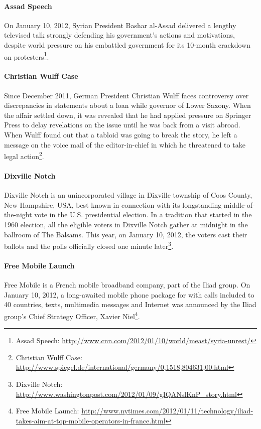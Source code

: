 \documentclass{acm_proc_article-sp}
\newcommand{\inlinelistingsize}{\fontsize{8pt}{11pt}}
\let\oldurl\url
\renewcommand{\url}[1]{\inlinelistingsize\oldurl{#1}}
\begin{document}
\paragraph{Assad Speech}
On January 10, 2012, Syrian President Bashar al-Assad delivered a lengthy televised talk strongly defending his government's actions and motivations, despite world pressure on his embattled government for its 10-month crackdown on protesters\footnote{Assad Speech: \url{http://www.cnn.com/2012/01/10/world/meast/syria-unrest/}}. 

\paragraph{Christian Wulff Case}
Since December 2011, German President Christian Wulff faces controversy over discrepancies in statements about a loan while governor of Lower Saxony.
When the affair settled down, it was revealed that he had applied pressure on Springer Press to delay revelations on the issue until he was back from a visit abroad.
When Wulff found out that a tabloid was going to break the story, he left a message on the voice mail of the editor-in-chief in which he threatened to take legal action\footnote{Christian Wulff Case: \url{http://www.spiegel.de/international/germany/0,1518,804631,00.html}}.

\paragraph{Dixville Notch}
Dixville Notch is an unincorporated village in Dixville township of Coos County, New Hampshire, USA, best known in connection with its longstanding middle-of-the-night vote in the U.S. presidential election.
In a tradition that started in the 1960 election, all the eligible voters in Dixville Notch gather at midnight in the ballroom of The Balsams.
This year, on January 10, 2012, the voters cast their ballots and the polls officially closed one minute later\footnote{Dixville Notch: \url{http://www.washingtonpost.com/2012/01/09/gIQANslKnP_story.html}}.

\paragraph{Free Mobile Launch}
Free Mobile is a French mobile broadband company, part of the Iliad group.
On January 10, 2012, a long-awaited mobile phone package for  with calls included to 40 countries, texts, multimedia messages and Internet was announced by the Iliad group's Chief Strategy Officer, Xavier Niel\footnote{Free Mobile Launch: \url{http://www.nytimes.com/2012/01/11/technology/iliad-takes-aim-at-top-mobile-operators-in-france.html}}.
\end{document}
